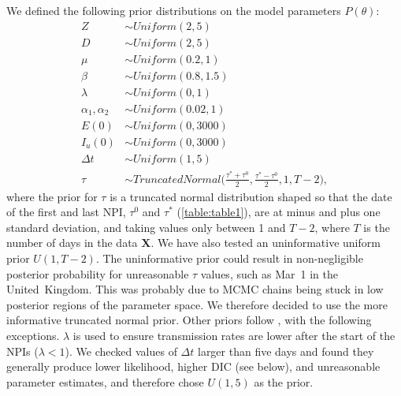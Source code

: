 \documentclass[12pt]{extarticle}
\let\vec\mathbf
\begin{document}
We defined the following prior distributions on the model parameters $P(\theta)$: 
\begin{equation} \label{eq:priors}
\begin{aligned} %
Z & \sim \mathit{Uniform}(2, 5) \\
D & \sim \mathit{Uniform}(2, 5) \\
\mu & \sim \mathit{Uniform}(0.2, 1) \\
\beta & \sim \mathit{Uniform}(0.8, 1.5) \\
\lambda & \sim \mathit{Uniform}(0, 1) \\
\alpha_1, \alpha_2 & \sim \mathit{Uniform}(0.02, 1)\\
E(0) & \sim \mathit{Uniform}(0, 3000) \\
I_u(0) & \sim \mathit{Uniform}(0, 3000) \\
\Delta t & \sim \mathit{Uniform}(1, 5) \\
\tau &\sim \mathit{TruncatedNormal}\Big(\frac{\tau^*+\tau^0}{2}, \frac{\tau^*-\tau^0}{2}, 1, T-2\Big),
\end{aligned}
\end{equation}
where the prior for $\tau$ is a truncated normal distribution shaped so that the date of the first and last NPI, $\tau^0$ and $\tau^*$ (\autoref{table:table1}), are at minus and plus one standard deviation, and taking values only between 1 and  $T-2$, where $T$ is the number of days in the data $\vec{X}$.
We have also tested an uninformative uniform prior $U(1,T-2)$. The uninformative prior could result in non-negligible posterior probability for unreasonable $\tau$ values, such as Mar~1 in the United~Kingdom. This was probably due to MCMC chains being stuck in low posterior regions of the parameter space. We therefore decided to use the more informative truncated normal prior.
Other priors follow \citet{Li2020}, with the following exceptions.
$\lambda$ is used to ensure transmission rates are lower after the start of the NPIs ($\lambda < 1$).
We checked values of $\Delta t$ larger than five days and found they generally produce lower likelihood, higher DIC (see below), and unreasonable parameter estimates, and therefore chose $U(1,5)$ as the prior.



\end{document}
